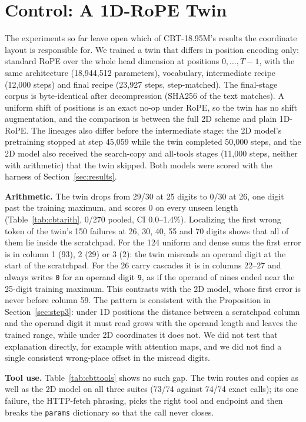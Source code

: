 \documentclass[10pt,twocolumn]{article}
\begin{document}
\section{Control: A 1D-RoPE Twin}\label{sec:control}

The experiments so far leave open which of CBT-18.95M's results the coordinate layout is responsible for. We trained a twin that differs in position encoding only: standard RoPE over the whole head dimension at positions $0,\dots,T-1$, with the same architecture (18,944,512 parameters), vocabulary, intermediate recipe (12,000 steps) and final recipe (23,927 steps, step-matched). The final-stage corpus is byte-identical after decompression (SHA256 of the text matches). A uniform shift of positions is an exact no-op under RoPE, so the twin has no shift augmentation, and the comparison is between the full 2D scheme and plain 1D-RoPE. The lineages also differ before the intermediate stage: the 2D model's pretraining stopped at step 45,059 while the twin completed 50,000 steps, and the 2D model also received the search-copy and all-tools stages (11,000 steps, neither with arithmetic) that the twin skipped. Both models were scored with the harness of Section~\ref{sec:results}.

\textbf{Arithmetic.} The twin drops from 29/30 at 25 digits to 0/30 at 26, one digit past the training maximum, and scores 0 on every unseen length (Table~\ref{tab:cbtarith}, 0/270 pooled, CI 0.0--1.4\%). Localizing the first wrong token of the twin's 150 failures at 26, 30, 40, 55 and 70 digits shows that all of them lie inside the scratchpad. For the 124 uniform and dense sums the first error is in column 1 (93), 2 (29) or 3 (2): the twin misreads an operand digit at the start of the scratchpad. For the 26 carry cascades it is in columns 22--27 and always writes \texttt{0} for an operand digit \texttt{9}, as if the operand of nines ended near the 25-digit training maximum. This contrasts with the 2D model, whose first error is never before column 59. The pattern is consistent with the Proposition in Section~\ref{sec:step3}: under 1D positions the distance between a scratchpad column and the operand digit it must read grows with the operand length and leaves the trained range, while under 2D coordinates it does not. We did not test that explanation directly, for example with attention maps, and we did not find a single consistent wrong-place offset in the misread digits.

\textbf{Tool use.} Table~\ref{tab:cbttools} shows no such gap. The twin routes and copies as well as the 2D model on all three suites (73/74 against 74/74 exact calls); its one failure, the HTTP-fetch phrasing, picks the right tool and endpoint and then breaks the \texttt{params} dictionary so that the call never closes.
\end{document}

